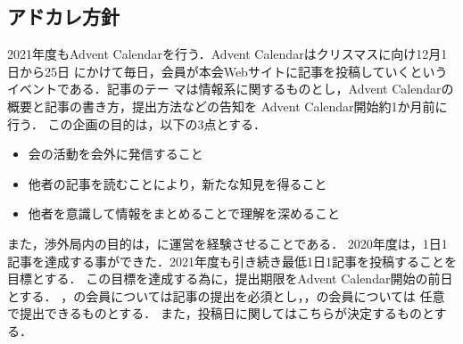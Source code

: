 \subsection*{アドカレ方針}


2021年度もAdvent Calendarを行う．Advent Calendarはクリスマスに向け12月1日から25日
にかけて毎日，会員が本会Webサイトに記事を投稿していくというイベントである．記事のテー
マは情報系に関するものとし，Advent Calendarの概要と記事の書き方，提出方法などの告知を
Advent Calendar開始約1か月前に行う．
この企画の目的は，以下の3点とする．
\begin{itemize}
    \item 会の活動を会外に発信すること
    \item 他者の記事を読むことにより，新たな知見を得ること
    \item 他者を意識して情報をまとめることで理解を深めること
\end{itemize}
また，渉外局内の目的は，\firstGrade{}に運営を経験させることである．
2020年度は，1日1記事を達成する事ができた．2021年度も引き続き最低1日1記事を投稿することを目標とする．
この目標を達成する為に，提出期限をAdvent Calendar開始の前日とする．
\firstGrade{}，\secondGrade{}の会員については記事の提出を必須とし，\thirdGrade{}，\fourthGrade{}の会員については
任意で提出できるものとする．
また，投稿日に関してはこちらが決定するものとする．
